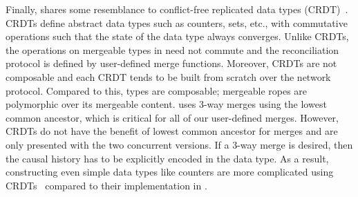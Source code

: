 Finally, \name shares some resemblance to conflict-free replicated
data types (CRDT)~\cite{crdt}. CRDTs define abstract data types such
as counters, sets, etc., with commutative operations such that the
state of the data type always converges. Unlike CRDTs, the operations
on mergeable types in \name need not commute and the reconciliation
protocol is defined by user-defined merge functions. Moreover, CRDTs
are not composable and each CRDT tends to be built from scratch over
the network protocol. Compared to this, \name types are composable;
mergeable ropes are polymorphic over its mergeable content. \name uses
3-way merges using the lowest common ancestor, which is critical for
all of our user-defined merges. However, CRDTs do not have the benefit
of lowest common ancestor for merges and are only presented with the
two concurrent versions. If a 3-way merge is desired, then the causal
history has to be explicitly encoded in the data type. As a result,
constructing even simple data types like counters are more complicated
using CRDTs~\cite{crdt} compared to their implementation in \name.
